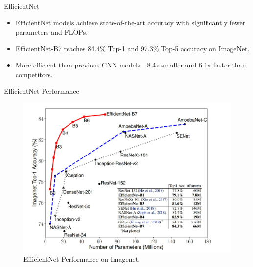 \begin{frame}{EfficientNet}
    \begin{itemize}
        \item EfficientNet models achieve state-of-the-art accuracy with significantly fewer parameters and FLOPs.        
        \pause
        \item EfficientNet-B7 reaches 84.4\% Top-1 and 97.3\% Top-5 accuracy on ImageNet.
        \pause
        \item More efficient than previous CNN models---8.4x smaller and 6.1x faster than competitors.
    \end{itemize}
\end{frame}


\begin{frame}{EfficientNet Performance}
    \begin{figure}
        \centering
        \includegraphics[width=\textwidth,height=.7\textheight,keepaspectratio]{images/cnn/ENet_2.png}
        \caption*{EfficientNet Performance on Imagenet.}
    \end{figure}
\end{frame}
